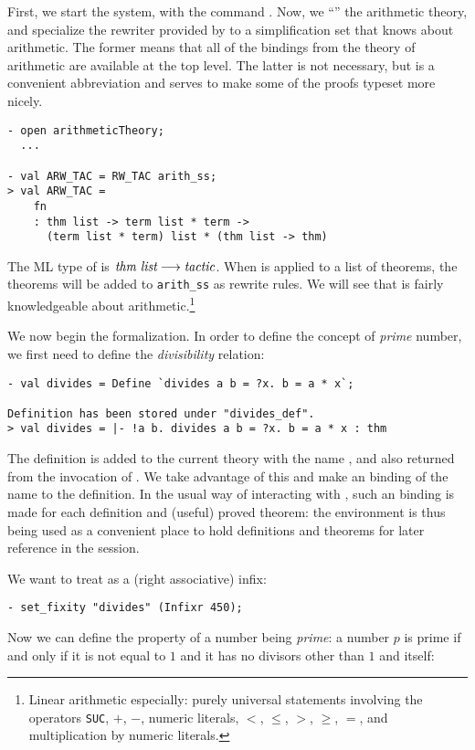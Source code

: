 First, we start the system, with the command .
Now, we ``'' the arithmetic theory, and specialize the
rewriter provided by  to a simplification set that knows
about arithmetic.  The former means that all of the \ML{} bindings
from the \HOL{} theory of arithmetic are available at the top level.
The latter is not necessary, but is a convenient abbreviation and
serves to make some of the proofs typeset more nicely.
\begin{session}
\begin{verbatim}
- open arithmeticTheory;
  ...

- val ARW_TAC = RW_TAC arith_ss;
> val ARW_TAC =
    fn
    : thm list -> term list * term ->
      (term list * term) list * (thm list -> thm)
\end{verbatim}
\end{session}
The ML type of  is $\mbox{\it thm list} \longrightarrow
\mbox{\it tactic}$. When  is applied to a list of theorems, the
theorems will be added to \verb+arith_ss+ as rewrite rules.  We will see
that  is fairly knowledgeable about
arithmetic.\footnote{Linear arithmetic especially: purely universal
statements involving the operators {\tt SUC}, $+$, $-$, numeric
literals, $<$, $\leq$, $>$, $\geq$, $=$, and multiplication by numeric
literals.}

We now begin the formalization. In order to define the concept of  \emph
{prime} number, we first need to define the \emph{divisibility} relation:

\begin{session}\begin{verbatim}
- val divides = Define `divides a b = ?x. b = a * x`;

Definition has been stored under "divides_def".
> val divides = |- !a b. divides a b = ?x. b = a * x : thm
\end{verbatim}\end{session}
    The definition is added to the current theory with the name
    , and also returned from the invocation of
    . We take advantage of this and make an \ML{} binding
    of the name  to the definition. In the usual way of
    interacting with \HOL, such an \ML{} binding is made for each
    definition and (useful) proved theorem: the \ML{} environment is
    thus being used as a convenient place to hold definitions and
    theorems for later reference in the session.

We want to treat  as a (right associative) infix:
\begin{session}\begin{verbatim}
- set_fixity "divides" (Infixr 450);
\end{verbatim}\end{session}
Now we can define the property of a number being \emph{prime}: a number $p$ is
prime if and only if it is not equal to $1$ and it has no divisors other
than $1$ and itself:

